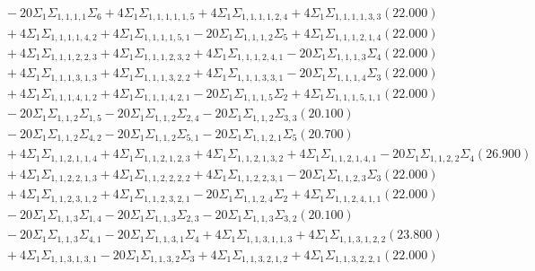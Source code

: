 \documentclass[12pt]{article}
\begin{document}
\begin{landscape}
\begin{align*}
		&\quad\quad -20\Sigma_{1}\Sigma_{1,1,1,1}\Sigma_{6}+4\Sigma_{1}\Sigma_{1,1,1,1,1,5}+4\Sigma_{1}\Sigma_{1,1,1,1,2,4}+4\Sigma_{1}\Sigma_{1,1,1,1,3,3}(22.000) \\ 
		&\quad\quad +4\Sigma_{1}\Sigma_{1,1,1,1,4,2}+4\Sigma_{1}\Sigma_{1,1,1,1,5,1}-20\Sigma_{1}\Sigma_{1,1,1,2}\Sigma_{5}+4\Sigma_{1}\Sigma_{1,1,1,2,1,4}(22.000) \\ 
		&\quad\quad +4\Sigma_{1}\Sigma_{1,1,1,2,2,3}+4\Sigma_{1}\Sigma_{1,1,1,2,3,2}+4\Sigma_{1}\Sigma_{1,1,1,2,4,1}-20\Sigma_{1}\Sigma_{1,1,1,3}\Sigma_{4}(22.000) \\ 
		&\quad\quad +4\Sigma_{1}\Sigma_{1,1,1,3,1,3}+4\Sigma_{1}\Sigma_{1,1,1,3,2,2}+4\Sigma_{1}\Sigma_{1,1,1,3,3,1}-20\Sigma_{1}\Sigma_{1,1,1,4}\Sigma_{3}(22.000) \\ 
		&\quad\quad +4\Sigma_{1}\Sigma_{1,1,1,4,1,2}+4\Sigma_{1}\Sigma_{1,1,1,4,2,1}-20\Sigma_{1}\Sigma_{1,1,1,5}\Sigma_{2}+4\Sigma_{1}\Sigma_{1,1,1,5,1,1}(22.000) \\ 
		&\quad\quad -20\Sigma_{1}\Sigma_{1,1,2}\Sigma_{1,5}-20\Sigma_{1}\Sigma_{1,1,2}\Sigma_{2,4}-20\Sigma_{1}\Sigma_{1,1,2}\Sigma_{3,3}(20.100) \\ 
		&\quad\quad -20\Sigma_{1}\Sigma_{1,1,2}\Sigma_{4,2}-20\Sigma_{1}\Sigma_{1,1,2}\Sigma_{5,1}-20\Sigma_{1}\Sigma_{1,1,2,1}\Sigma_{5}(20.700) \\ 
		&\quad\quad +4\Sigma_{1}\Sigma_{1,1,2,1,1,4}+4\Sigma_{1}\Sigma_{1,1,2,1,2,3}+4\Sigma_{1}\Sigma_{1,1,2,1,3,2}+4\Sigma_{1}\Sigma_{1,1,2,1,4,1}-20\Sigma_{1}\Sigma_{1,1,2,2}\Sigma_{4}(26.900) \\ 
		&\quad\quad +4\Sigma_{1}\Sigma_{1,1,2,2,1,3}+4\Sigma_{1}\Sigma_{1,1,2,2,2,2}+4\Sigma_{1}\Sigma_{1,1,2,2,3,1}-20\Sigma_{1}\Sigma_{1,1,2,3}\Sigma_{3}(22.000) \\ 
		&\quad\quad +4\Sigma_{1}\Sigma_{1,1,2,3,1,2}+4\Sigma_{1}\Sigma_{1,1,2,3,2,1}-20\Sigma_{1}\Sigma_{1,1,2,4}\Sigma_{2}+4\Sigma_{1}\Sigma_{1,1,2,4,1,1}(22.000) \\ 
		&\quad\quad -20\Sigma_{1}\Sigma_{1,1,3}\Sigma_{1,4}-20\Sigma_{1}\Sigma_{1,1,3}\Sigma_{2,3}-20\Sigma_{1}\Sigma_{1,1,3}\Sigma_{3,2}(20.100) \\ 
		&\quad\quad -20\Sigma_{1}\Sigma_{1,1,3}\Sigma_{4,1}-20\Sigma_{1}\Sigma_{1,1,3,1}\Sigma_{4}+4\Sigma_{1}\Sigma_{1,1,3,1,1,3}+4\Sigma_{1}\Sigma_{1,1,3,1,2,2}(23.800) \\ 
		&\quad\quad +4\Sigma_{1}\Sigma_{1,1,3,1,3,1}-20\Sigma_{1}\Sigma_{1,1,3,2}\Sigma_{3}+4\Sigma_{1}\Sigma_{1,1,3,2,1,2}+4\Sigma_{1}\Sigma_{1,1,3,2,2,1}(22.000) \\ 

\end{align*}
\end{landscape}
\end{document}
